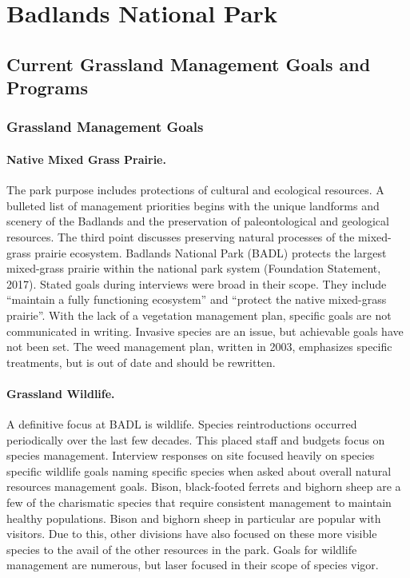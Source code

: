 \section{Badlands National Park}

\subsection{Current Grassland Management Goals and Programs}

\subsubsection{Grassland Management Goals}

\paragraph{Native Mixed Grass Prairie.} The park purpose includes protections of cultural and ecological resources. 
A bulleted list of management priorities begins with the unique landforms and scenery of the Badlands and the preservation of paleontological and geological resources. 
The third point discusses preserving natural processes of the mixed-grass prairie ecosystem.
Badlands National Park (BADL) protects the largest mixed-grass prairie within the national park system (Foundation Statement, 2017).
Stated goals during interviews were broad in their scope. 
They include ``maintain a fully functioning ecosystem'' and ``protect the native mixed-grass prairie''. 
With the lack of a vegetation management plan, specific goals are not communicated in writing.
Invasive species are an issue, but achievable goals have not been set. 
The weed management plan, written in 2003, emphasizes specific treatments, but is out of date and should be rewritten.

\paragraph{Grassland Wildlife.} A definitive focus at BADL is wildlife.
Species reintroductions occurred periodically over the last few decades.
This placed staff and budgets focus on species management. 
Interview responses on site focused heavily on species specific wildlife goals naming specific species when asked about overall natural resources management goals. 
Bison, black-footed ferrets and bighorn sheep are a few of the charismatic species that require consistent management to maintain healthy populations. 
Bison and bighorn sheep in particular are popular with visitors. 
Due to this, other divisions have also focused on these more visible species to the avail of the other resources in the park. 
Goals for wildlife management are numerous, but laser focused in their scope of species vigor.

